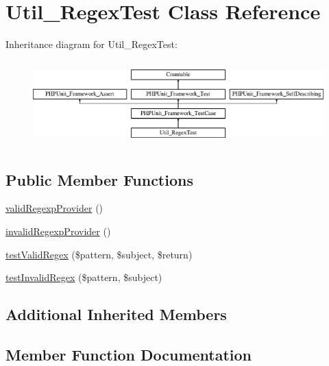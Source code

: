 \hypertarget{class_util___regex_test}{}\section{Util\+\_\+\+Regex\+Test Class Reference}
\label{class_util___regex_test}
Inheritance diagram for Util\+\_\+\+Regex\+Test\+:\begin{figure}[H]
\begin{center}
\leavevmode
\includegraphics[height=3.303835cm]{class_util___regex_test}
\end{center}
\end{figure}
\subsection*{Public Member Functions}
\begin{DoxyCompactItemize}
\item 
\mbox{\hyperlink{class_util___regex_test_a35e873088e9ead976c820962f51a5435}{valid\+Regexp\+Provider}} ()
\item 
\mbox{\hyperlink{class_util___regex_test_afeab7d748e48a06b1c316b9b5b3e76f9}{invalid\+Regexp\+Provider}} ()
\item 
\mbox{\hyperlink{class_util___regex_test_a4f81f311e0111be2d46824c05f82089b}{test\+Valid\+Regex}} (\$pattern, \$subject, \$return)
\item 
\mbox{\hyperlink{class_util___regex_test_afe2a78223125ddf6b61db3636f96d457}{test\+Invalid\+Regex}} (\$pattern, \$subject)
\end{DoxyCompactItemize}
\subsection*{Additional Inherited Members}


\subsection{Member Function Documentation}
\mbox{\label{class_util___regex_test_afeab7d748e48a06b1c316b9b5b3e76f9}} 
